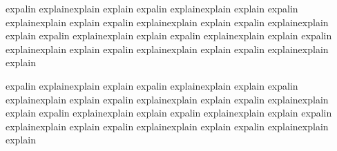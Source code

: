 {expalin explainexplain explain expalin explainexplain explain expalin explainexplain explain expalin explainexplain explain
expalin explainexplain explain expalin explainexplain explain expalin explainexplain explain expalin explainexplain explain
expalin explainexplain explain expalin explainexplain explain

expalin explainexplain explain expalin explainexplain explain expalin explainexplain explain expalin explainexplain explain
expalin explainexplain explain expalin explainexplain explain expalin explainexplain explain expalin explainexplain explain
expalin explainexplain explain expalin explainexplain explain


%
%
%
% 
% 
%
%
 





}
